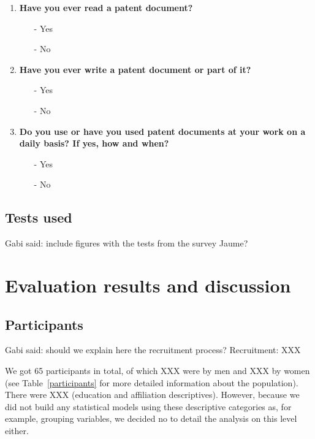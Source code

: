 \documentclass[11pt]{article}
\begin{document}
\begin{enumerate}
\item \textbf{Have you ever read a patent document?}
	\begin{itemize}
	\item[-] Yes
	\item[-] No
	\end{itemize}

\item \textbf{Have you ever write a patent document or part of it?}
	\begin{itemize}
	\item[-] Yes
	\item[-] No
	\end{itemize}

\item \textbf{Do you use or have you used patent documents at your work on a daily basis? If yes, how and when?}
	\begin{itemize}
	\item[-] Yes
	\item[-] No
	\end{itemize}
\end{enumerate}



\subsection{Tests used}
{\color{blue} Gabi said: include figures with the tests from the survey}
{\color{blue} Jaume?}




\section{Evaluation results and discussion}
\label{eval}


\subsection{Participants}

{\color{blue} Gabi said: should we explain here the recruitment process?}
Recruitment: XXX

We got 65 participants in total, of which XXX were by men and XXX by women (see Table~\ref{participants} for more detailed information about the population). There were XXX (education and affiliation descriptives). 
However, because we did not build any statistical models using these descriptive categories as, for example, grouping variables, we decided no to detail the analysis on this level either.
\end{document}
